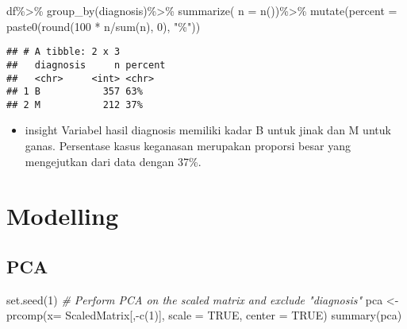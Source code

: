 \documentclass[
]{article}
\newenvironment{Shaded}{\begin{snugshade}}{\end{snugshade}}
\newcommand{\AttributeTok}[1]{\textcolor[rgb]{0.77,0.63,0.00}{#1}}
\newcommand{\CommentTok}[1]{\textcolor[rgb]{0.56,0.35,0.01}{\textit{#1}}}
\newcommand{\ConstantTok}[1]{\textcolor[rgb]{0.00,0.00,0.00}{#1}}
\newcommand{\DecValTok}[1]{\textcolor[rgb]{0.00,0.00,0.81}{#1}}
\newcommand{\FunctionTok}[1]{\textcolor[rgb]{0.00,0.00,0.00}{#1}}
\newcommand{\NormalTok}[1]{#1}
\newcommand{\OtherTok}[1]{\textcolor[rgb]{0.56,0.35,0.01}{#1}}
\newcommand{\SpecialCharTok}[1]{\textcolor[rgb]{0.00,0.00,0.00}{#1}}
\newcommand{\StringTok}[1]{\textcolor[rgb]{0.31,0.60,0.02}{#1}}
\providecommand{\tightlist}{%
  \setlength{\itemsep}{0pt}\setlength{\parskip}{0pt}}
\begin{document}
\begin{Shaded}
\begin{Highlighting}[]
\NormalTok{df}\SpecialCharTok{\%\textgreater{}\%}
\FunctionTok{group\_by}\NormalTok{(diagnosis)}\SpecialCharTok{\%\textgreater{}\%}
\FunctionTok{summarize}\NormalTok{(}
    \AttributeTok{n =} \FunctionTok{n}\NormalTok{())}\SpecialCharTok{\%\textgreater{}\%}
\FunctionTok{mutate}\NormalTok{(}\AttributeTok{percent =} \FunctionTok{paste0}\NormalTok{(}\FunctionTok{round}\NormalTok{(}\DecValTok{100} \SpecialCharTok{*}\NormalTok{ n}\SpecialCharTok{/}\FunctionTok{sum}\NormalTok{(n), }\DecValTok{0}\NormalTok{), }\StringTok{"\%"}\NormalTok{))}
\end{Highlighting}
\end{Shaded}

\begin{verbatim}
## # A tibble: 2 x 3
##   diagnosis     n percent
##   <chr>     <int> <chr>  
## 1 B           357 63%    
## 2 M           212 37%
\end{verbatim}

\begin{itemize}
\tightlist
\item
  insight Variabel hasil diagnosis memiliki kadar B untuk jinak dan M
  untuk ganas. Persentase kasus keganasan merupakan proporsi besar yang
  mengejutkan dari data dengan 37\%.
\end{itemize}

\hypertarget{modelling}{%
\section{Modelling}\label{modelling}}

\hypertarget{pca}{%
\subsection{PCA}\label{pca}}

\begin{Shaded}
\begin{Highlighting}[]
\FunctionTok{set.seed}\NormalTok{(}\DecValTok{1}\NormalTok{) }
\CommentTok{\# Perform PCA on the scaled matrix and exclude "diagnosis"}
\NormalTok{pca }\OtherTok{\textless{}{-}} \FunctionTok{prcomp}\NormalTok{(}\AttributeTok{x=}\NormalTok{ ScaledMatrix[,}\SpecialCharTok{{-}}\FunctionTok{c}\NormalTok{(}\DecValTok{1}\NormalTok{)], }\AttributeTok{scale =} \ConstantTok{TRUE}\NormalTok{, }\AttributeTok{center =} \ConstantTok{TRUE}\NormalTok{)}
\FunctionTok{summary}\NormalTok{(pca)}
\end{Highlighting}
\end{Shaded}
\end{document}
